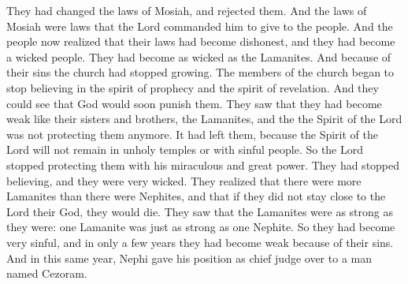 They had changed the laws of Mosiah, and rejected them. And the laws of Mosiah were laws that the Lord commanded him to give to the people. And the people now realized that their laws had become dishonest, and they had become a wicked people. They had become as wicked as the Lamanites.
\bverse \iffalse And because of their iniquity the church had begun to dwindle; and they began to disbelieve in the spirit of prophecy and in the spirit of revelation; and the judgments of God did stare them in the face. \fi
And because of their sins the church had stopped growing. The members of the church began to stop believing in the spirit of prophecy and the spirit of revelation. And they could see that God would soon punish them.
\bverse \iffalse And they saw that they had become weak, like unto their brethren, the Lamanites, and that the Spirit of the Lord did no more preserve them; yea, it had withdrawn from them because the Spirit of the Lord doth not dwell in unholy temples-- \fi
They saw that they had become weak like their sisters and brothers, the Lamanites, and the the Spirit of the Lord was not protecting them anymore. It had left them, because the Spirit of the Lord will not remain in unholy temples or with sinful people.
\bverse \iffalse Therefore the Lord did cease to preserve them by his miraculous and matchless power, for they had fallen into a state of unbelief and awful wickedness; and they saw that the Lamanites were exceedingly more numerous than they, and except they should cleave unto the Lord their God, they must unavoidably perish. \fi
So the Lord stopped protecting them with his miraculous and great power. They had stopped believing, and they were very wicked. They realized that there were more Lamanites than there were Nephites, and that if they did not stay close to the Lord their God, they would die.
\bverse \iffalse For behold, they saw that the strength of the Lamanites was as great as their strength, even man for man. And thus had they fallen into this great transgression; yea, thus had they become weak, because of their transgression, in the space of not many years. \fi
They saw that the Lamanites were as strong as they were: one Lamanite was just as strong as one Nephite. So they had become very sinful, and in only a few years they had become weak because of their sins.
\bchapter
\bverse \iffalse And it came to pass that in this same year, behold, Nephi delivered up the judgment-seat to a man whose name was Cezoram. \fi
And in this same year, Nephi gave his position as chief judge over to a man named Cezoram.
